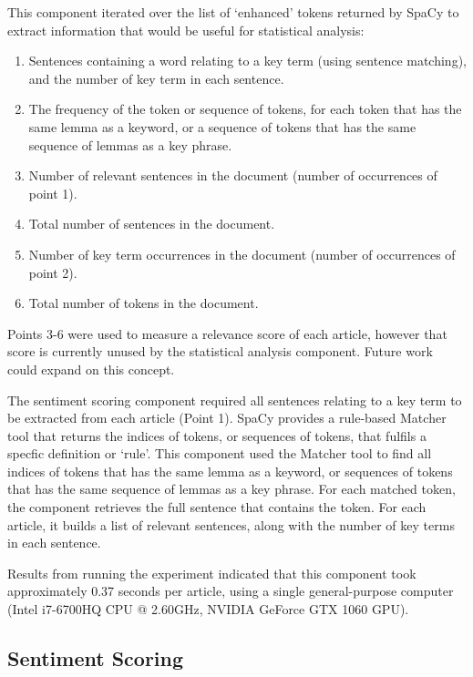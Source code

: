 \documentclass{report}
\begin{document}
This component iterated over the list of `enhanced' tokens returned by SpaCy to extract information that would be useful for statistical analysis:
\begin{enumerate}
	\item Sentences containing a word relating to a key term (using sentence matching), and the number of key term in each sentence.
	\item The frequency of the token or sequence of tokens, for each token that has the same lemma as a keyword, or a sequence of tokens that has the same sequence of lemmas as a key phrase.
	\item Number of relevant sentences in the document (number of occurrences of point 1).
	\item Total number of sentences in the document.
	\item Number of key term occurrences in the document (number of occurrences of point 2).
	\item Total number of tokens in the document.
\end{enumerate}

Points 3-6 were used to measure a relevance score of each article, however that score is currently unused by the statistical analysis component. 
Future work could expand on this concept.

The sentiment scoring component required all sentences relating to a key term to be extracted from each article (Point 1).
SpaCy provides a rule-based Matcher tool that returns the indices of tokens, or sequences of tokens, that fulfils a specfic definition or `rule'.
This component used the Matcher tool to find all indices of tokens that has the same lemma as a keyword, or sequences of tokens that has the same sequence of lemmas as a key phrase.
For each matched token, the component retrieves the full sentence that contains the token. 
For each article, it builds a list of relevant sentences, along with the number of key terms in each sentence.

Results from running the experiment indicated that this component took approximately 0.37 seconds per article, using a single general-purpose computer (Intel i7-6700HQ CPU @ 2.60GHz, NVIDIA GeForce GTX 1060 GPU).

\subsection{Sentiment Scoring} \label{des-sentiment}
\end{document}
